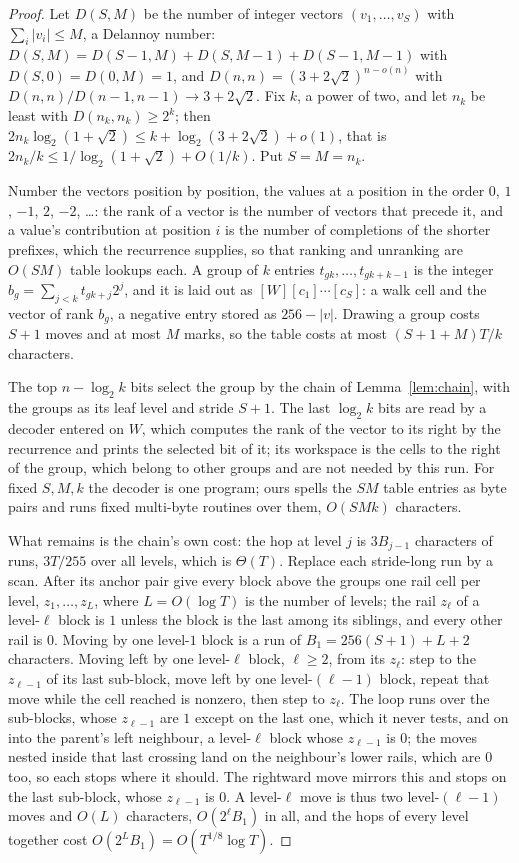 \documentclass[11pt]{article}
\theoremstyle{remark}
\begin{document}
\begin{proof}
Let $D(S,M)$ be the number of integer vectors $(v_1,\ldots,v_S)$ with
$\sum_i|v_i|\le M$, a Delannoy number: $D(S,M)=D(S-1,M)+D(S,M-1)+D(S-1,M-1)$
with $D(S,0)=D(0,M)=1$, and $D(n,n)=(3+2\sqrt2)^{n-o(n)}$ with
$D(n,n)/D(n-1,n-1)\to3+2\sqrt2$.  Fix $k$, a power of two, and let $n_k$ be
least with $D(n_k,n_k)\ge2^k$; then
$2n_k\log_2(1+\sqrt2)\le k+\log_2(3+2\sqrt2)+o(1)$, that is
$2n_k/k\le1/\log_2(1+\sqrt2)+O(1/k)$.  Put $S=M=n_k$.

Number the vectors position by position, the values at a position in the
order $0$, $1$, $-1$, $2$, $-2$, \ldots: the rank of a vector is the
number of vectors that precede it, and a value's contribution at position
$i$ is the number of completions of the shorter prefixes, which the
recurrence supplies, so that ranking and unranking are $O(SM)$ table
lookups each.  A group of $k$ entries $t_{gk},\ldots,t_{gk+k-1}$ is the
integer $b_g=\sum_{j<k}t_{gk+j}2^j$, and it is laid out as
$[W][c_1]\cdots[c_S]$: a walk cell and the vector of rank $b_g$, a
negative entry stored as $256-|v|$.  Drawing a group costs $S+1$ moves
and at most $M$ marks, so the table costs at most $(S+1+M)T/k$
characters.

The top $n-\log_2k$ bits select the group by the chain of
Lemma~\ref{lem:chain}, with the groups as its leaf level and stride $S+1$.
The last $\log_2k$ bits are read by a decoder entered on $W$, which computes
the rank of the vector to its right by the recurrence and prints the
selected bit of it; its workspace is the cells to the right of the group,
which belong to other groups and are not needed by this run.  For fixed
$S,M,k$ the decoder is one program; ours spells the $SM$ table entries as
byte pairs and runs fixed multi-byte routines over them, $O(SMk)$ characters.

What remains is the chain's own cost: the hop at level $j$ is $3B_{j-1}$
characters of runs, $3T/255$ over all levels, which is $\Theta(T)$.  Replace
each stride-long run by a scan.  After its anchor pair give every block above
the groups one rail cell per level, $z_1,\ldots,z_L$, where $L=O(\log T)$ is
the number of levels; the rail $z_\ell$ of a level-$\ell$ block is $1$
unless the block is the last among its siblings, and every other rail is
$0$.  Moving by one level-$1$ block is a run of $B_1=256(S+1)+L+2$
characters.  Moving left by one level-$\ell$ block, $\ell\ge2$, from its
$z_\ell$: step to the $z_{\ell-1}$ of its last sub-block, move left by one
level-$(\ell-1)$ block, repeat that move while the cell reached is nonzero,
then step to $z_\ell$.  The loop runs over the sub-blocks, whose
$z_{\ell-1}$ are $1$ except on the last one, which it never tests, and on
into the parent's left neighbour, a level-$\ell$ block whose $z_{\ell-1}$
is $0$; the moves nested inside that last crossing land on the neighbour's
lower rails, which are $0$ too, so each stops where it should.  The
rightward move mirrors this and stops on the last sub-block, whose
$z_{\ell-1}$ is $0$.  A level-$\ell$ move is thus two level-$(\ell-1)$
moves and $O(L)$ characters, $O(2^\ell B_1)$ in all, and the hops of every
level together cost $O(2^LB_1)=O(T^{1/8}\log T)$.


\end{proof}
\end{document}
